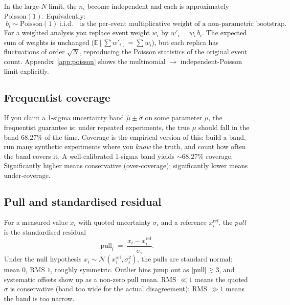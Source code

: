 \documentclass[12pt]{article}
\begin{document}
In the large-$N$ limit, the $n_{i}$ become independent and each is
approximately $\mathrm{Poisson}(1)$. Equivalently:
\begin{equation}
\boxed{\;b_{i} \sim \mathrm{Poisson}(1)\;\text{i.i.d.}\quad\text{is the per-event multiplicative weight of a non-parametric bootstrap.}\;}
\end{equation}
For a weighted analysis you replace event weight $w_{i}$ by $w'_{i} =
w_{i}\,b_{i}$. The expected sum of weights is unchanged
($\mathbb{E}[\sum w'_{i}]=\sum w_{i}$), but each replica has
fluctuations of order $\sqrt{N}$, reproducing the Poisson statistics
of the original event count. Appendix~\ref{app:poisson} shows the
multinomial $\to$ independent-Poisson limit explicitly.

\subsection{Frequentist coverage}
\label{sec:coverage-prereq}

If you claim a 1-sigma uncertainty band $\hat\mu \pm \hat\sigma$ on
some parameter $\mu$, the frequentist guarantee is: under repeated
experiments, the true $\mu$ should fall in the band $68.27\%$ of the
time. Coverage is the empirical version of this: build a band, run
many synthetic experiments where you \emph{know} the truth, and count
how often the band covers it. A well-calibrated 1-sigma band yields
$\sim 68.27\%$ coverage. Significantly higher means conservative
(over-coverage); significantly lower means under-coverage.

\subsection{Pull and standardised residual}
\label{sec:pull-prereq}

For a measured value $x_{i}$ with quoted uncertainty $\sigma_{i}$ and
a reference $x^{\text{ref}}_{i}$, the \emph{pull} is the standardised
residual
\begin{equation}
\mathrm{pull}_{i} \;=\; \frac{x_{i} - x^{\text{ref}}_{i}}{\sigma_{i}}.
\end{equation}
Under the null hypothesis $x_{i}\sim\mathcal{N}(x^{\text{ref}}_{i},
\sigma_{i}^{2})$, the pulls are standard normal: mean $0$, RMS $1$,
roughly symmetric. Outlier bins jump out as $|\mathrm{pull}| \gtrsim
3$, and systematic offsets show up as a non-zero pull mean. RMS
$\ll 1$ means the quoted $\sigma$ is conservative (band too wide for
the actual disagreement); RMS $\gg 1$ means the band is too narrow.
\end{document}
